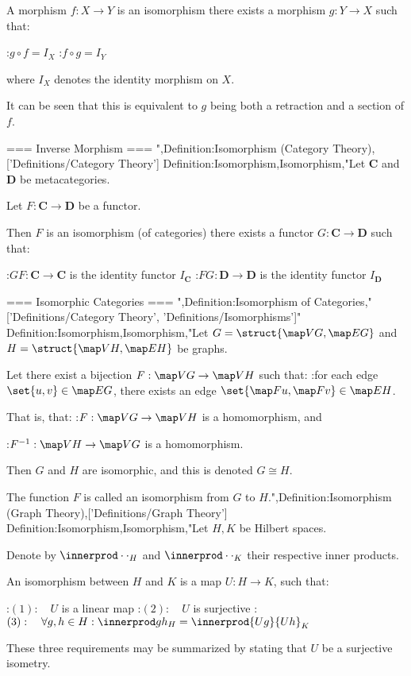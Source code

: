 A morphism $f: X \to Y$ is an isomorphism  there exists a morphism $g: Y \to X$ such that:

:$g \circ f = I_X$
:$f \circ g = I_Y$

where $I_X$ denotes the identity morphism on $X$.

It can be seen that this is equivalent to $g$ being both a retraction and a section of $f$.


=== Inverse Morphism ===
",Definition:Isomorphism (Category Theory),['Definitions/Category Theory']
Definition:Isomorphism,Isomorphism,"Let $\mathbf C$ and $\mathbf D$ be metacategories.

Let $F: \mathbf C \to \mathbf D$ be a functor.


Then $F$ is an isomorphism (of categories)  there exists a functor $G: \mathbf C \to \mathbf D$ such that:

:$G F: \mathbf C \to \mathbf C$ is the identity functor $I_{\mathbf C}$
:$F G: \mathbf D \to \mathbf D$ is the identity functor $I_{\mathbf D}$


=== Isomorphic Categories ===
",Definition:Isomorphism of Categories,"['Definitions/Category Theory', 'Definitions/Isomorphisms']"
Definition:Isomorphism,Isomorphism,"Let $G = \struct {\map V G, \map E G}$ and $H = \struct {\map V H, \map E H}$ be graphs.

Let there exist a bijection $F: \map V G \to \map V H$ such that:
:for each edge $\set {u, v} \in \map E G$, there exists an edge $\set {\map F u, \map F v} \in \map E H$.


That is, that:
:$F: \map V G \to \map V H$ is a homomorphism, and

:$F^{-1}: \map V H \to \map V G$ is a homomorphism.


Then $G$ and $H$ are isomorphic, and this is denoted $G \cong H$.

The function $F$ is called an isomorphism from $G$ to $H$.",Definition:Isomorphism (Graph Theory),['Definitions/Graph Theory']
Definition:Isomorphism,Isomorphism,"Let $H, K$ be Hilbert spaces.

Denote by $\innerprod \cdot \cdot_H$ and $\innerprod \cdot \cdot_K$ their respective inner products.

An isomorphism between $H$ and $K$ is a map $U: H \to K$, such that:

:$(1): \quad U$ is a linear map
:$(2): \quad U$ is surjective
:$(3): \quad \forall g, h \in H: \innerprod g h_H = \innerprod {U g} {U h}_K$

These three requirements may be summarized by stating that $U$ be a surjective isometry.

